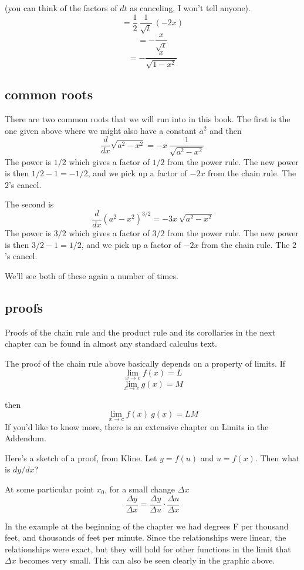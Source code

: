 \documentclass[11pt, oneside]{article}
\begin{document}
(you can think of the factors of $dt$ as canceling, I won't tell anyone).
\[ =  \frac{1}{2} \ \frac{1}{\sqrt{t}} \ (-2x) \]
\[ = - \frac{x}{\sqrt{t}} \] 
\[ = - \frac{x}{\sqrt{1-x^2}} \]

\subsection*{common roots}

There are two common roots that we will run into in this book.  The first is the one given above where we might also have a constant $a^2$ and then
\[ \frac{d}{dx} \sqrt{a^2 - x^2} =  - x \ \frac{1}{\sqrt{a^2 - x^2}} \]
The power is $1/2$ which gives a factor of $1/2$ from the power rule.  The new power is then $1/2-1 = -1/2$, and we pick up a factor of $-2x$ from the chain rule.  The $2$'s cancel.

The second is
\[ \frac{d}{dx} (a^2 - x^2)^{3/2} = -3x \ \sqrt{a^2 - x^2} \]
The power is $3/2$ which gives a factor of $3/2$ from the power rule.  The new power is then $3/2-1 = 1/2$, and we pick up a factor of $-2x$ from the chain rule.  The $2$'s cancel.

We'll see both of these again a number of times.

\subsection*{proofs}
Proofs of the chain rule and the product rule and its corollaries in the next chapter can be found in almost any standard calculus text.  

The proof of the chain rule above basically depends on a property of limits.  If
\[ \lim_{x \rightarrow c} f(x) = L \]
\[ \lim_{x \rightarrow c} g(x) = M \]

then
\[ \lim_{x \rightarrow c} f(x) \ g(x) = LM \]
If you'd like to know more, there is an extensive chapter on Limits in the Addendum.

Here's a sketch of a proof, from Kline.  Let $y = f(u)$ and $u = f(x)$.  Then what is $dy/dx$?

At some particular point $x_0$, for a small change $\Delta x$
\[ \frac{\Delta y}{\Delta x} = \frac{\Delta y}{\Delta u} \cdot \frac{\Delta u}{\Delta x} \]

In the example at the beginning of the chapter we had degrees F per thousand feet, and thousands of feet per minute.  Since the relationships were linear, the relationships were exact, but they will hold for other functions in the limit that $\Delta x$ becomes very small.  This can also be seen clearly in the graphic above.
\end{document}
